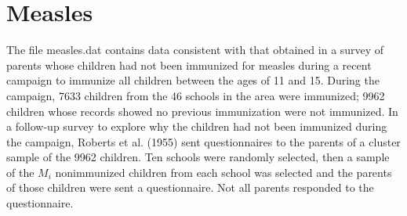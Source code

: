\documentclass[]{article}
\begin{document}
\section{Measles}
The file measles.dat contains data consistent with that obtained in a survey of parents whose children had not been immunized for measles during a recent campaign to immunize all children between the ages of 11 and 15. During the campaign, 7633 children from the 46 schools in the area were immunized; 9962 children whose records showed no previous immunization were not immunized. In a follow-up survey to explore why the children had not been immunized during the campaign, Roberts et al. (1955) sent questionnaires to the parents of a cluster sample of the 9962 children. Ten schools were randomly selected, then a sample of the $M_i$ nonimmunized children from each school was selected and the parents of those children were sent a questionnaire. Not all parents responded to the questionnaire.
\end{document}
